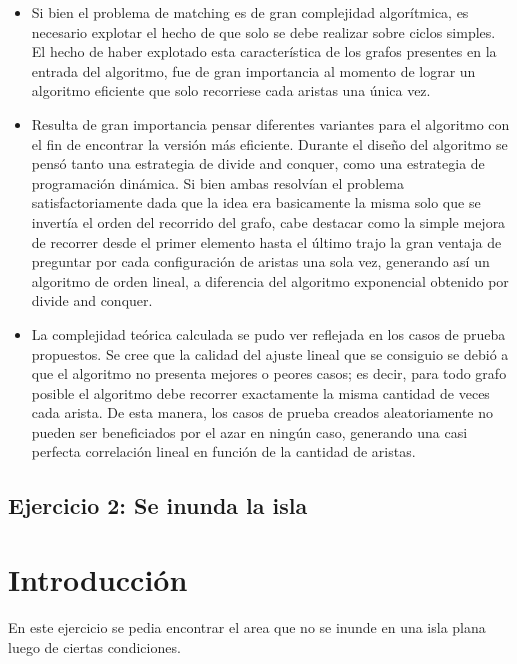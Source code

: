\documentclass[a4paper, 12pt]{article}
\begin{document}
\begin{itemize}
\item Si bien el problema de matching es de gran complejidad algor\'itmica, es necesario explotar el hecho de que solo se debe realizar sobre ciclos simples. El hecho de haber explotado esta caracter\'istica de los grafos presentes en la entrada del algoritmo, fue de gran importancia al momento de lograr un algoritmo eficiente que solo recorriese cada aristas una \'unica vez.
\item Resulta de gran importancia pensar diferentes variantes para el algoritmo con el fin de encontrar la versi\'on m\'as eficiente. Durante el dise\~{n}o del algoritmo se pens\'o tanto una estrategia de divide and conquer, como una estrategia de programaci\'on din\'amica. Si bien ambas resolv\'ian el problema satisfactoriamente dada que la idea era basicamente la misma solo que se invert\'ia el orden del recorrido del grafo, cabe destacar como la simple mejora de recorrer desde el primer elemento hasta el \'ultimo trajo la gran ventaja de preguntar por cada configuraci\'on de aristas una sola vez, generando as\'i un algoritmo de orden lineal, a diferencia del algoritmo exponencial obtenido por divide and conquer.
\item La complejidad te\'orica calculada se pudo ver reflejada en los casos de prueba propuestos. Se cree que la calidad del ajuste lineal que se consiguio se debi\'o a que el algoritmo no presenta mejores o peores casos; es decir, para todo grafo posible el algoritmo debe recorrer exactamente la misma cantidad de veces cada arista. De esta manera, los casos de prueba creados aleatoriamente no pueden ser beneficiados por el azar en ning\'un caso, generando una casi perfecta correlaci\'on lineal en funci\'on de la cantidad de aristas.
\end{itemize}



\begin{center}
\item \section*{Ejercicio 2: Se inunda la isla}
\end{center}

\section*{Introducci\'on}
En este ejercicio se pedia encontrar el area que no se inunde en una isla plana luego de ciertas condiciones.
\end{document}
